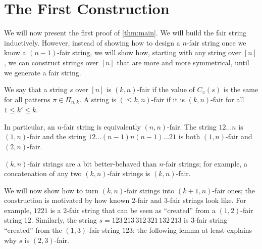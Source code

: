 \documentclass{article}
\begin{document}
\section{The First Construction}
\label{sec:inductive_proof}

We will now present the first proof of \cref{thm:main}. 
We will build the fair string inductively. 
However, instead of showing how to design a $n$-fair string once we know a $(n-1)$-fair string, we will show how, starting with any string over $[n]$, we can construct strings over $[n]$ that are more and more symmetrical, until we generate a fair string. 

\begin{definition}
We say that a string $s$ over $[n]$ is $(k, n)$-fair if the value of $C_\pi(s)$ is the same for all patterns $\pi \in \Pi_{n,k}$.
A string is $(\le k, n)$-fair if it is $(k, n)$-fair for all $1 \le k' \le k$. 
\end{definition}

In particular, an $n$-fair string is equivalently $(n, n)$-fair. The string $12\dots n$ is $(1,n)$-fair and the string $12\dots (n-1) n (n-1) \dots 2 1$ is both $(1,n)$-fair and $(2,n)$-fair. 

$(k,n)$-fair strings are a bit better-behaved than $n$-fair strings; for example, a concatenation of any two $(k,n)$-fair strings is $(k,n)$-fair. 

We will now show how to turn $(k,n)$-fair strings into $(k+1,n)$-fair ones; the construction is motivated by how known $2$-fair and $3$-fair strings look like. For example, $1221$ is a $2$-fair string that can be seen as ``created'' from a $(1,2)$-fair string $12$. Similarly, the string $s = 123\,213\, 312\, 321\, 132\, 213$ is $3$-fair string ``created'' from the $(1,3)$-fair string $123$; the following lemma at least explains why $s$ is $(2,3)$-fair. 
\end{document}
